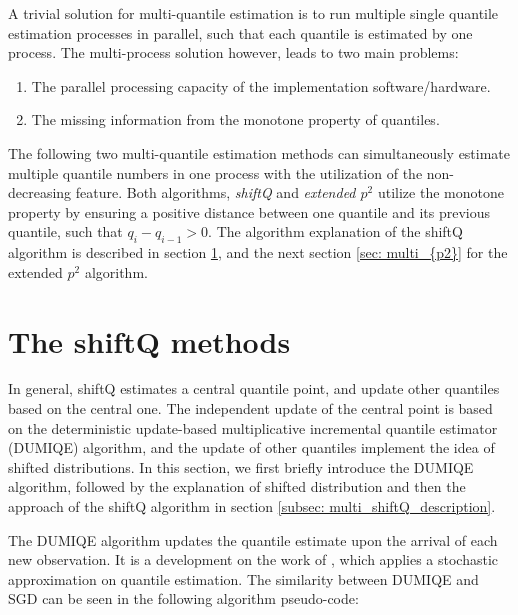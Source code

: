 A trivial solution for multi-quantile estimation is to run multiple single quantile estimation processes in parallel, such that each quantile is estimated by one process. The multi-process solution however, leads to two main problems:
\begin{enumerate}
    \item The parallel processing capacity of the implementation software/hardware.
    \item The missing information from the monotone property of quantiles.
\end{enumerate}

The following two multi-quantile estimation methods can simultaneously estimate multiple quantile numbers in one process with the utilization of the non-decreasing feature. Both algorithms, \textit{shiftQ}\cite{hammerJointTrackingMultiple2019b} and \textit{extended $p^2$}\cite{raatikainenSequentialProcedureSimultaneous1993} utilize the monotone property by ensuring a positive distance between one quantile and its previous quantile, such that 
$q_{i} - q_{i-1} > 0$. The algorithm explanation of the shiftQ algorithm is described in section \ref{sec: multi_shiftQ}, and the next section \ref{sec: multi_{p2}} for the extended $p^2$ algorithm.


\section{The shiftQ methods}
\label{sec: multi_shiftQ}

In general, shiftQ estimates a central quantile point, and update other quantiles based on the central one. The independent update of the central point is based on the deterministic update-based multiplicative incremental quantile estimator (DUMIQE) algorithm\cite{yazidiMultiplicativeUpdateMethods2019}, and the update of other quantiles implement the idea of shifted distributions. In this section, we first briefly introduce the DUMIQE algorithm, followed by the explanation of shifted distribution and then the approach of the shiftQ algorithm in section \ref{subsec: multi_shiftQ_description}.

The DUMIQE algorithm updates the quantile estimate upon the arrival of each new observation. It is a development on the work of \citeauthor{tierneySpaceEfficientRecursiveProcedure1983}\cite{tierneySpaceEfficientRecursiveProcedure1983}, which applies a stochastic approximation on quantile estimation. The similarity between DUMIQE and SGD can be seen in the following algorithm pseudo-code:


